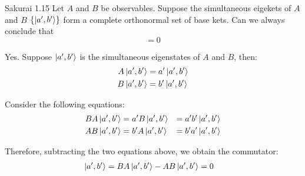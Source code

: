 \documentclass{article}
\begin{document}
	\newpage
	\begin{section}{Sakurai 1.15}
		Let $A$ and $B$ be observables. Suppose the simultaneous eigekets of $A$ and $B$ $\left\{\ket{a', b'}\right\}$ form a complete orthonormal set of base kets. Can we always conclude that
		\begin{equation*}
			[A, B] = 0
		\end{equation*}

		\begin{tcolorbox}
			Yes. Suppose $\ket{a', b'}$ is the simultaneous eigenstates of $A$ and $B$, then:
			\begin{align*}
				A\ket{a', b'} &= a' \ket{a', b'} \\
				B\ket{a', b'} &= b' \ket{a', b'}
			\end{align*}

			Consider the following equations:
			\begin{align*}
				BA\ket{a', b'} &= a' B\ket{a', b'} &= a'b' \ket{a', b'}\\
				AB\ket{a', b'} &= b' A\ket{a', b'} &= b'a' \ket{a', b'}
			\end{align*}

			Therefore, subtracting the two equations above, we obtain the commutator:
			\begin{align*}
				[A, B] \ket{a', b'} &= BA\ket{a', b'} - AB\ket{a', b'} = 0
			\end{align*}
		\end{tcolorbox}

	\end{section}
\end{document}
